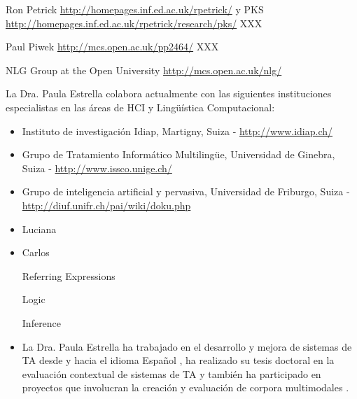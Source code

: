 Ron Petrick \url{http://homepages.inf.ed.ac.uk/rpetrick/} y
PKS \url{http://homepages.inf.ed.ac.uk/rpetrick/research/pks/} XXX

Paul Piwek \url{http://mcs.open.ac.uk/pp2464/} XXX

NLG Group at the Open University \url{http://mcs.open.ac.uk/nlg/}

La Dra. Paula Estrella colabora actualmente con las siguientes instituciones especialistas en las \'areas de HCI y  Ling\"u\'istica Computacional:
\begin{itemize}
    \item  Instituto de investigaci\'on Idiap, Martigny, Suiza -  \url{http://www.idiap.ch/}
\item Grupo de Tratamiento Inform\'atico Multiling\"ue, Universidad de Ginebra, Suiza - \url{http://www.issco.unige.ch/}
\item Grupo de inteligencia artificial y pervasiva, Universidad de Friburgo, Suiza - \url{http://diuf.unifr.ch/pai/wiki/doku.php}
\end{itemize}

\begin{itemize}
    \item Luciana
\citep{benotti09c}
\citep{benotti09b}
\item Carlos

Referring Expressions
\citep{AKS08}
\citep{AF08}

Logic
\citep{ABM01}
\citep{arec:hybr05b}

Inference
\citep{AG06}
\citep{ANR01}

\item La Dra. Paula Estrella ha trabajado en el desarrollo y mejora de sistemas de TA desde y hacia el idioma Espa\~nol \citep{estr:expe05}, ha realizado su tesis doctoral en la evaluaci\'on contextual de sistemas de TA \citep{estr:impr08, estr:femt09} y tambi\'en ha participado en proyectos que involucran la creaci\'on y evaluaci\'on de corpora multimodales \citep{pope:estr07}.
  
\end{itemize}
